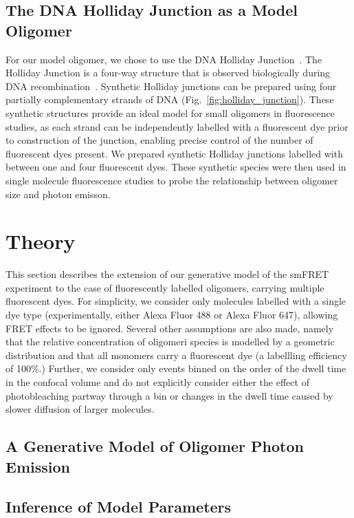 \subsection{The DNA Holliday Junction as a Model Oligomer}
For our model oligomer, we chose to use the DNA Holliday Junction~\cite{holliday1964}. The Holliday Junction is a four-way structure that is observed biologically during DNA recombination~\cite{potter1976}. Synthetic Holliday junctions can be prepared using four partially complementary strands of DNA (Fig.~\ref{fig:holliday_junction}). These synthetic structures provide an ideal model for small oligomers in fluorescence studies, as each strand can be independently labelled with a fluorescent dye prior to construction of the junction, enabling precise control of the number of fluorescent dyes present. We prepared synthetic Holliday junctions labelled with between one and four fluorescent dyes. These synthetic species were then used in single molecule fluorescence studies to probe the relationship between oligomer size and photon emisson. 

\section{Theory}

This section describes the extension of our generative model of the smFRET experiment to the case of fluorescently labelled oligomers, carrying multiple fluorescent dyes. For simplicity, we consider only molecules labelled with a single dye type (experimentally, either Alexa Fluor 488 or Alexa Fluor 647), allowing FRET effects to be ignored. Several other assumptions are also made, namely that the relative concentration of oligomeri species is modelled by a geometric distribution and that all monomers carry a fluorescent dye (a labellling efficiency of 100\%.) Further, we consider only events binned on the order of the dwell time in the confocal volume and do not explicitly consider either the effect of photobleaching partway through a bin or changes in the dwell time caused by slower diffusion of larger molecules.

\subsection{A Generative Model of Oligomer Photon Emission}


\subsection{Inference of Model Parameters}

